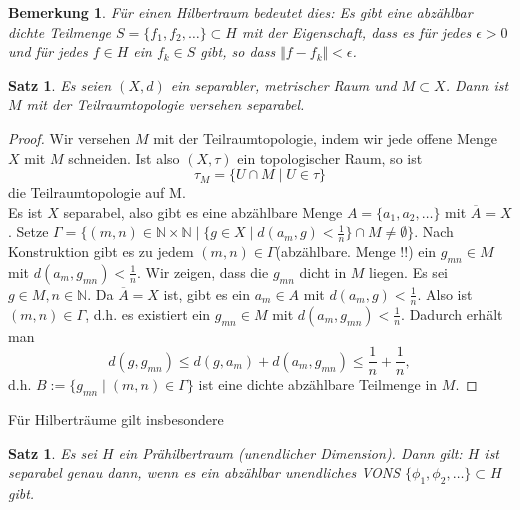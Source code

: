 \documentclass[12pt,titlepage]{article}
\newtheorem{bemerkung}[zahl]{Bemerkung}
\newtheorem{satz}[zahl]{Satz}
\numberwithin{equation}{section}
\begin{document}
\begin{bemerkung}
Für einen Hilbertraum bedeutet dies: Es gibt eine abzählbar dichte Teilmenge $S=\{f_1,f_2,\ldots\}\subset H$ mit der Eigenschaft, dass es für jedes $\epsilon >0$ und für jedes $f\in H$ ein $f_k \in S$ gibt, so dass $\Vert f-f_k\Vert < \epsilon$.
\end{bemerkung}
\begin{satz}
Es seien $(X,d)$ ein separabler, metrischer Raum und $M \subset X$. Dann ist $M$ mit der Teilraumtopologie versehen separabel.
\end{satz}
\begin{proof}
Wir versehen $M$ mit der Teilraumtopologie, indem wir jede offene Menge $X$ mit $M$ schneiden. Ist also $(X,\tau)$ ein topologischer Raum, so ist 
\[
\tau_M=\{U\cap M \mid U\in \tau\} 
\] die Teilraumtopologie auf M.\\
Es ist $X$ separabel, also gibt es eine abzählbare Menge $A=\{a_1,a_2,\ldots\}$ mit $\overline{A}=X$.
Setze $\Gamma=\{(m,n)\in \mathbb{N} \times \mathbb{N}\mid \{g\in X\mid d(a_m,g)<\frac{1}{n}\}\cap M \neq \emptyset\}$. Nach Konstruktion gibt es zu jedem $(m,n)\in \Gamma$(abzählbare. Menge !!) ein $g_{mn}\in M$ mit $d(a_m,g_{mn})< \frac{1}{n}$. Wir zeigen, dass die $g_{mn}$ dicht in $M$ liegen. Es sei $g \in M , n \in \mathbb{N}$. Da $\overline{A}=X$ ist, gibt es ein $a_m \in A$ mit $d(a_m,g)< \frac{1}{n}$. Also ist $(m,n)\in \Gamma$, d.h. es existiert ein $g_{mn}\in M$ mit $d(a_m,g_{mn})< \frac{1}{n}$. Dadurch erhält man 
\[
d(g,g_{mn})\leq d(g,a_m)+d(a_m,g_{mn})\leq  \frac{1}{n}+\frac{1}{n},
\]
d.h. $B:=\{g_{mn}\mid (m,n)\in \Gamma\}$ ist eine dichte abzählbare Teilmenge in $M$.
\end{proof}
Für Hilberträume gilt insbesondere
\begin{satz}
Es sei $H$ ein Prähilbertraum (unendlicher Dimension). Dann gilt: 
$H$ ist separabel genau dann, wenn es ein abzählbar unendliches VONS $\{\phi_1,\phi_2,\ldots\}\subset H$ gibt.
\end{satz}
\end{document}
